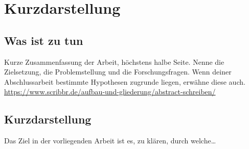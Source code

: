 
\thispagestyle{empty}
\section*{Kurzdarstellung}
\label{sec:kurzdarstellung}

\subsection{Was ist zu tun}
Kurze Zusammenfassung der Arbeit, höchstens halbe Seite.
Nenne die Zielsetzung, die Problemstellung und die Forschungsfragen. Wenn deiner Abschlussarbeit bestimmte Hypothesen zugrunde liegen, erwähne diese auch.
\\ \url{https://www.scribbr.de/aufbau-und-gliederung/abstract-schreiben/}


\subsection{Kurzdarstellung}
Das Ziel in der vorliegenden Arbeit ist es, zu klären, durch welche\dots


